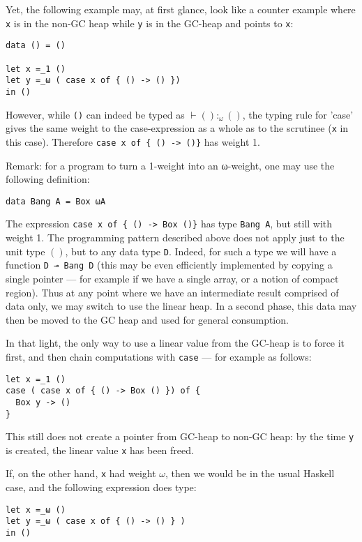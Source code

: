 \documentclass[11pt]{article}
\begin{document}



Yet, the following example may, at first glance, look like a counter
example where \verb|x| is in the non-GC heap while \verb|y| is in the
GC-heap and points to \verb|x|:
\begin{verbatim}
data () = ()

let x =_1 ()
let y =_ω ( case x of { () -> () })
in ()
\end{verbatim}
However, while \verb|()| can indeed be typed as $⊢ () :_ω ()$, the
typing rule for 'case' gives the same weight to the case-expression as
a whole as to the scrutinee (\verb|x| in this case). Therefore
\verb|case x of { () -> ()}| has weight 1.

Remark: for a program to turn a 1-weight into an ω-weight, one may use
the following definition:
\begin{verbatim}
data Bang A = Box ωA
\end{verbatim}
The expression \verb|case x of { () -> Box ()}| has type
\verb|Bang A|, but still with weight 1.  The programming pattern described above does not apply
just to the unit type $()$, but to any data type \verb|D|. Indeed, for such
a type we will have a function \verb|D ⊸ Bang D| (this may be even
efficiently implemented by copying a single pointer --- for example if
we have a single array, or a notion of compact region).  Thus at any
point where we have an intermediate result comprised of data only, we
may switch to use the linear heap. In a second phase, this data may
then be moved to the GC heap and used for general consumption.

In that light, the only way to use a linear value from the GC-heap is
to force it first, and then chain computations with \verb|case| --- for
example as follows:
\begin{verbatim}
let x =_1 ()
case ( case x of { () -> Box () }) of {
  Box y -> ()
}
\end{verbatim}
This still does not create a pointer from GC-heap to non-GC heap: by the
time \verb|y| is created, the linear value \verb|x| has been freed.

If, on the other hand, \verb|x| had weight $ω$, then we would be in the
usual Haskell case, and the following expression does type:
\begin{verbatim}
let x =_ω ()
let y =_ω ( case x of { () -> () } )
in ()
\end{verbatim}
\end{document}
